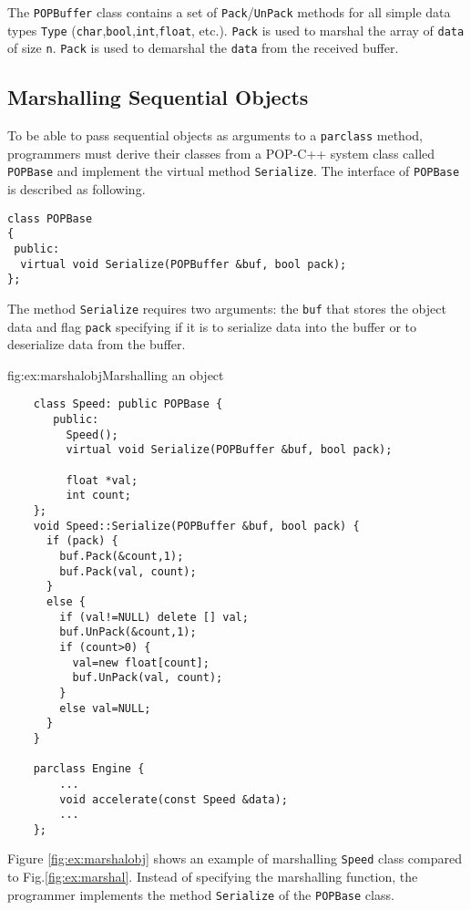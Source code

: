 The \texttt{POPBuffer} class contains a set of \texttt{Pack}/\texttt{UnPack} methods for
all simple data types \texttt{Type} (\texttt{char},\texttt{bool},\texttt{int},\texttt{float}, etc.). \texttt{Pack}
is used to marshal the array of \texttt{data} of size \texttt{n}.  \texttt{Pack} is used
to demarshal the \texttt{data} from the received buffer. 

\subsection{Marshalling Sequential Objects} \label{sbsec:marshallingObject}

To be able to pass sequential objects as arguments to a \texttt{parclass} method,
programmers must derive their classes from a POP-C++ system class called
\texttt{POPBase} and implement the virtual method \texttt{Serialize}.
The interface of \texttt{POPBase} is described as following.

\begin{verbatim}
class POPBase
{
 public:
  virtual void Serialize(POPBuffer &buf, bool pack);
};
\end{verbatim}

The method \texttt{Serialize} requires two arguments: the \texttt{buf} that stores the
object data and flag \texttt{pack} specifying if it is to serialize data into the
buffer or to deserialize data from the buffer.


  \begin{figura}{fig:ex:marshalobj}{Marshalling an object}%
\vspace{-4mm}%
\begin{verbatim}
    class Speed: public POPBase {
       public:
         Speed();
         virtual void Serialize(POPBuffer &buf, bool pack);
  
         float *val;
         int count;
    };
    void Speed::Serialize(POPBuffer &buf, bool pack) {
      if (pack) {
        buf.Pack(&count,1);
        buf.Pack(val, count);
      }
      else {
        if (val!=NULL) delete [] val;
        buf.UnPack(&count,1);
        if (count>0) {
          val=new float[count];
          buf.UnPack(val, count);
        }
        else val=NULL;
      }
    }

    parclass Engine {
        ...
        void accelerate(const Speed &data);
        ...
    };
\end{verbatim}
\end{figura}

Figure \ref{fig:ex:marshalobj} shows an example of marshalling \texttt{Speed}
class compared to Fig.\ref{fig:ex:marshal}. Instead of specifying the
marshalling function, the programmer implements the
method \texttt{Serialize} of the \texttt{POPBase} class.

